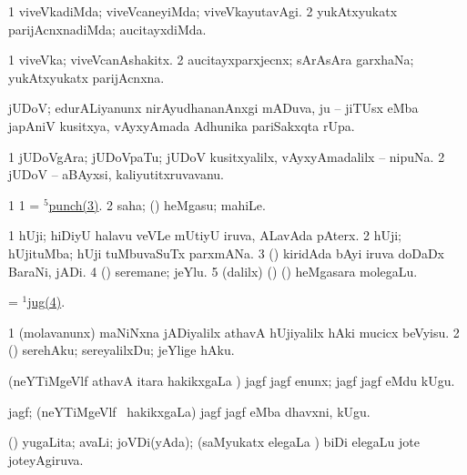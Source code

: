 \bentry
{}
\gl{\kirxvi}
\bmng
\bnum
\num{1} viveVkadiMda; viveVcaneyiMda; viveVkayutavAgi. 
\num{2} yukAtxyukatx parijAcnxnadiMda; aucitayxdiMda. 
\enum
\emng
\eentry

\bentry
{}
\gl{\nA}
\bmng
\bnum
\num{1} viveVka; viveVcanAshakitx. 
\num{2} aucitayxparxjecnx; sArAsAra garxhaNa; yukAtxyukatx parijAcnxna. 
\enum
\emng
\eentry

\bentry
{}
\gl{\nA}
\bmng
jUDoV; edurALiyanunx nirAyudhananAnxgi mADuva, ju -- jiTUsx eMba japAniV kusitxya, vAyxyAmada Adhunika pariSakxqta rUpa. 
\emng
\eentry

\bentry
{}
\gl{\nA}
\bmng
\bnum
\num{1} jUDoVgAra; jUDoVpaTu; jUDoV kusitxyalilx, vAyxyAmadalilx -- nipuNa. 
\num{2} jUDoV -- aBAyxsi, kaliyutitxruvavanu. 
\enum
\emng
\eentry

\bentry
{}
\gl{\nA}
\bmng
\bnum
\num{1} 
\num{1} = \hyperref{kandict_p.pdf}{P}{punch(5)3}{$^5$punch(3)}. 
\num{2}  saha; (\ashi) heMgasu; mahiLe. 
\enum
\emng
\eentry

\bentry
{}
\gl{\nA}
\bmng
\bnum
\num{1} hUji; hiDiyU halavu veVLe mUtiyU iruva, ALavAda pAterx. 
\num{2} hUji; hUjituMba; hUji tuMbuvaSuTx parxmANa. 
\num{3} (\ame) kiridAda bAyi iruva doDaDx BaraNi, jADi. 
\hypertarget{jug(1)4}{} 
\num{4} (\ashi) seremane; jeYlu. 
\num{5} (\bava dalilx) (\ame) (\ashi) heMgasara molegaLu. 
\enum
\emng

\noindent
\gl{\pagu}
\bmng
{} = \hyperlink{jug(1)4}{$^1$jug(4)}. 
\emng
\eentry


\bentry
{}
\gl{\sakirx}
\bmng
\bnum
\num{1} (molavanunx) maNiNxna jADiyalilx athavA hUjiyalilx hAki mucicx beVyisu. 
\num{2} (\ashi) serehAku; sereyalilxDu; jeYlige hAku. 
\enum
\emng
\eentry


\bentry
{}
\gl{\akirx}
\bmng
(neYTiMgeVlf athavA itara hakikxgaLa \vi) jagf jagf enunx; jagf jagf eMdu kUgu. 
\emng
\eentry


\bentry
{}
\gl{\nA}
\bmng
jagf; (neYTiMgeVlf \mo\ hakikxgaLa) jagf jagf eMba dhavxni, kUgu. 
\emng
\eentry

\bentry
{}
\gl{\gu}
\bmng
(\savi) yugaLita; avaLi; joVDi(yAda); (saMyukatx elegaLa \vi) biDi elegaLu jote joteyAgiruva. 
\emng
\eentry

